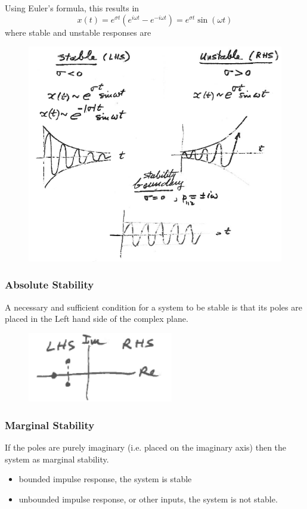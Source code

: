 \documentclass[12pt,letter]{article}
\begin{document}
Using Euler's formula, this results in
\begin{equation}
x(t) = e^{\sigma t} (e^{i \omega t}-e^{-i \omega t}) = e^{\sigma t} \sin(\omega t) 
\end{equation}
where stable and unstable responses are
\begin{figure}[H]
	\centering
	\includegraphics[width=4.5in]{../figures/stability_higher_order_systems_complex_poles}
\end{figure}

\subsubsection{Absolute Stability}
A necessary and sufficient condition for a system to be stable is that its poles are placed in the Left hand side of the complex plane. 
\begin{figure}[H]
	\centering
	\includegraphics[width=2.5in]{../figures/stable_system_complex_plane_simple}
\end{figure}

\subsubsection{Marginal Stability}
If the poles are purely imaginary (i.e. placed on the imaginary axis) then the system as marginal stability. 
\begin{itemize}
	\item bounded impulse response, the system is stable
	\item unbounded impulse response, or other inputs, the system is not stable. 
\end{itemize}
\end{document}
